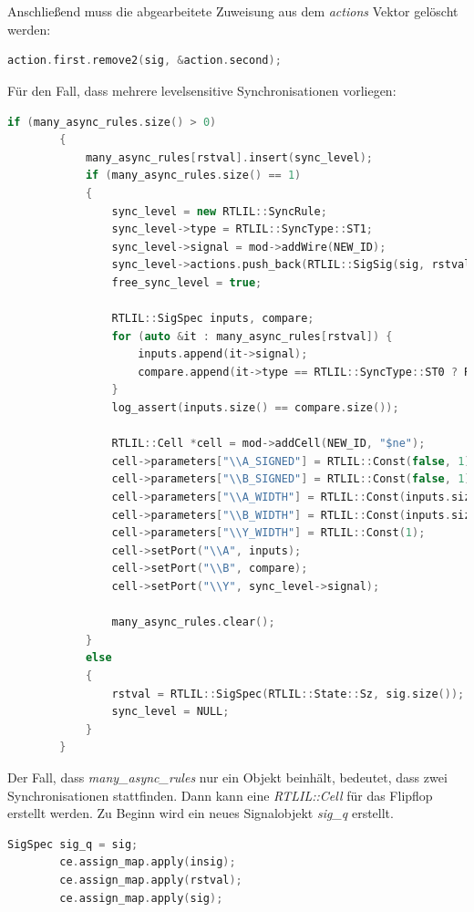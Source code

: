 \documentclass[11pt]{report}
\begin{document}
\begin{enumerate}
\\
\\
Anschließend muss die abgearbeitete Zuweisung aus dem \textit{actions} Vektor gelöscht werden:
\begin{lstlisting}[language=C++]
action.first.remove2(sig, &action.second);
\end{lstlisting}
Für den Fall, dass mehrere levelsensitive Synchronisationen vorliegen:
\begin{lstlisting}[language=C++]
if (many_async_rules.size() > 0)
		{
			many_async_rules[rstval].insert(sync_level);
			if (many_async_rules.size() == 1)
			{
				sync_level = new RTLIL::SyncRule;
				sync_level->type = RTLIL::SyncType::ST1;
				sync_level->signal = mod->addWire(NEW_ID);
				sync_level->actions.push_back(RTLIL::SigSig(sig, rstval));
				free_sync_level = true;

				RTLIL::SigSpec inputs, compare;
				for (auto &it : many_async_rules[rstval]) {
					inputs.append(it->signal);
					compare.append(it->type == RTLIL::SyncType::ST0 ? RTLIL::State::S1 : RTLIL::State::S0);
				}
				log_assert(inputs.size() == compare.size());

				RTLIL::Cell *cell = mod->addCell(NEW_ID, "$ne");
				cell->parameters["\\A_SIGNED"] = RTLIL::Const(false, 1);
				cell->parameters["\\B_SIGNED"] = RTLIL::Const(false, 1);
				cell->parameters["\\A_WIDTH"] = RTLIL::Const(inputs.size());
				cell->parameters["\\B_WIDTH"] = RTLIL::Const(inputs.size());
				cell->parameters["\\Y_WIDTH"] = RTLIL::Const(1);
				cell->setPort("\\A", inputs);
				cell->setPort("\\B", compare);
				cell->setPort("\\Y", sync_level->signal);

				many_async_rules.clear();
			}
			else
			{
				rstval = RTLIL::SigSpec(RTLIL::State::Sz, sig.size());
				sync_level = NULL;
			}
		}
\end{lstlisting}
Der Fall, dass \textit{many\_async\_rules} nur ein Objekt beinhält, bedeutet, dass zwei Synchronisationen stattfinden.
Dann kann eine \textit{RTLIL::Cell} für das Flipflop erstellt werden.
Zu Beginn wird ein neues Signalobjekt \textit{sig\_q} erstellt.
\begin{lstlisting}[language=C++]
SigSpec sig_q = sig;
		ce.assign_map.apply(insig);
		ce.assign_map.apply(rstval);
		ce.assign_map.apply(sig);


\end{lstlisting}
\end{enumerate}
\end{document}
